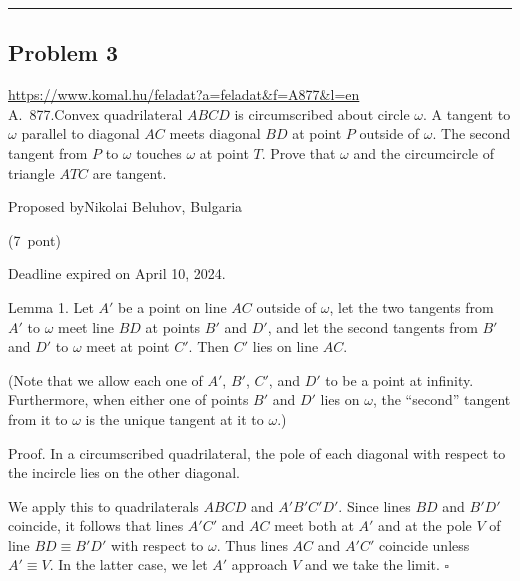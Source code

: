 \documentclass{article}
\begin{document}
\vspace{1em}
\hrule
\vspace{1em}

\subsection*{Problem 3}
\noindent\url{https://www.komal.hu/feladat?a=feladat&f=A877&l=en}\\[1em]

A. 877.Convex quadrilateral \(\displaystyle ABCD\) is circumscribed about circle \(\displaystyle \omega\). A tangent to \(\displaystyle \omega\) parallel to diagonal \(\displaystyle AC\) meets diagonal \(\displaystyle BD\) at point \(\displaystyle P\) outside of \(\displaystyle \omega\). The second tangent from \(\displaystyle P\) to \(\displaystyle \omega\) touches \(\displaystyle \omega\) at point \(\displaystyle T\). Prove that \(\displaystyle \omega\) and the circumcircle of triangle \(\displaystyle ATC\) are tangent.

Proposed byNikolai Beluhov, Bulgaria

(7 pont)

Deadline expired on April 10, 2024.

Lemma 1. Let \(\displaystyle A'\) be a point on line \(\displaystyle AC\) outside of \(\displaystyle \omega\), let the two tangents from \(\displaystyle A'\) to \(\displaystyle \omega\) meet line \(\displaystyle BD\) at points \(\displaystyle B'\) and \(\displaystyle D'\), and let the second tangents from \(\displaystyle B'\) and \(\displaystyle D'\) to \(\displaystyle \omega\) meet at point \(\displaystyle C'\). Then \(\displaystyle C'\) lies on line \(\displaystyle AC\).

(Note that we allow each one of \(\displaystyle A'\), \(\displaystyle B'\), \(\displaystyle C'\), and \(\displaystyle D'\) to be a point at infinity. Furthermore, when either one of points \(\displaystyle B'\) and \(\displaystyle D'\) lies on \(\displaystyle \omega\), the ``second'' tangent from it to \(\displaystyle \omega\) is the unique tangent at it to \(\displaystyle \omega\).)

Proof. In a circumscribed quadrilateral, the pole of each diagonal with respect to the incircle lies on the other diagonal.

We apply this to quadrilaterals \(\displaystyle ABCD\) and \(\displaystyle A'B'C'D'\). Since lines \(\displaystyle BD\) and \(\displaystyle B'D'\) coincide, it follows that lines \(\displaystyle A'C'\) and \(\displaystyle AC\) meet both at \(\displaystyle A'\) and at the pole \(\displaystyle V\) of line \(\displaystyle BD \equiv B'D'\) with respect to \(\displaystyle \omega\). Thus lines \(\displaystyle AC\) and \(\displaystyle A'C'\) coincide unless \(\displaystyle A' \equiv V\). In the latter case, we let \(\displaystyle A'\) approach \(\displaystyle V\) and we take the limit. \(\displaystyle \square\)
\end{document}
